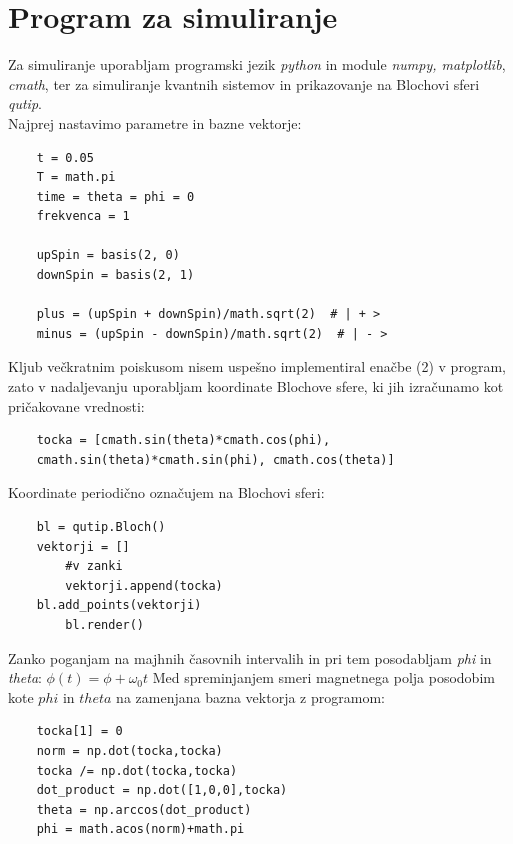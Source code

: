 \documentclass[12pt, a4paper]{article}
\begin{document}
\section{Program za simuliranje}
Za simuliranje uporabljam programski jezik \textit{python} in module \textit{numpy, matplotlib}, \textit{cmath}, ter za simuliranje kvantnih sistemov in prikazovanje na Blochovi sferi \textit{qutip}.\\
Najprej nastavimo parametre in bazne vektorje:
\lstset{language=Python} 
\begin{lstlisting}
	t = 0.05
	T = math.pi
	time = theta = phi = 0
	frekvenca = 1 

	upSpin = basis(2, 0)
	downSpin = basis(2, 1)

	plus = (upSpin + downSpin)/math.sqrt(2)  # | + >
	minus = (upSpin - downSpin)/math.sqrt(2)  # | - >
\end{lstlisting}
Kljub večkratnim poiskusom nisem uspešno implementiral enačbe (2) v program, zato v nadaljevanju uporabljam koordinate Blochove sfere, ki jih izračunamo kot pričakovane vrednosti:
\begin{lstlisting}
	tocka = [cmath.sin(theta)*cmath.cos(phi), 
	cmath.sin(theta)*cmath.sin(phi), cmath.cos(theta)]
\end{lstlisting}
Koordinate periodično označujem na Blochovi sferi:
\begin{lstlisting}
	bl = qutip.Bloch()
	vektorji = []
		#v zanki	
		vektorji.append(tocka)
	bl.add_points(vektorji)
    	bl.render() 
\end{lstlisting}
Zanko poganjam na majhnih časovnih intervalih in pri tem posodabljam \textit{phi} in \textit{theta}: $\phi(t) = \phi + \omega_0t$
Med spreminjanjem smeri magnetnega polja posodobim kote $phi$ in $theta$ na zamenjana bazna vektorja z programom:
\begin{lstlisting}
	tocka[1] = 0
	norm = np.dot(tocka,tocka)
	tocka /= np.dot(tocka,tocka)
	dot_product = np.dot([1,0,0],tocka)
	theta = np.arccos(dot_product)
	phi = math.acos(norm)+math.pi 
\end{lstlisting}
\newpage
\end{document}
